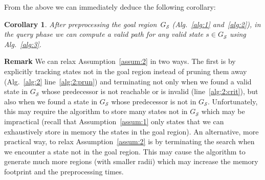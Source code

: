 \documentclass[letterpaper]{article} %
\newcommand{\calS}{\ensuremath{\mathcal{S}}\xspace}
\newtheorem{cor}{Corollary}
\begin{document}
From the above we can immediately deduce the following corollary:

\vspace{2mm}

\begin{cor}
	After preprocessing the goal region~$G_\calS$ (Alg.~\ref{alg:1} and~\ref{alg:2}), in the query phase we can compute a valid path for any valid state $s \in G_\calS$ using Alg.~\ref{alg:3}.
\end{cor}


\textbf{Remark}
We can relax Assumption~\ref{assum:2} in two ways.
The first is by explicitly tracking states not in the goal region instead of pruning them away (Alg.~\ref{alg:2} line~\ref{alg:2:prun}) and terminating not only when we found a valid state in $G_\calS$ whose predecessor is not reachable or is invalid (line~\ref{alg:2:crit}), but also when we found a state in $G_\calS$ whose predecessor is not in $G_\calS$.
Unfortunately, this may require the algorithm to store many states not in $G_\calS$  which may be impractical (recall that Assumption~\ref{assum:1} only states that we can exhaustively store in memory the states in the goal region).
An alternative, more practical way, to relax Assumption~\ref{assum:2}  is by terminating the search when we  encounter a state not in the goal region.
This may cause the algorithm to generate much more regions (with smaller radii) which may increase the memory footprint and the preprocessing times.
\end{document}
